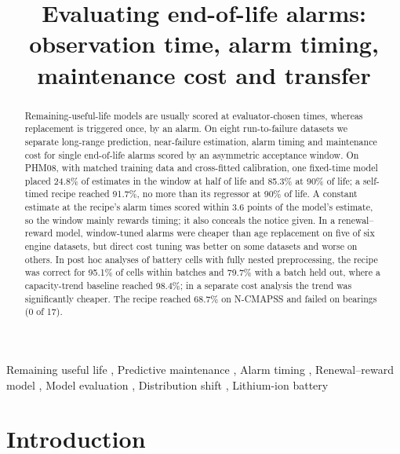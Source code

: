 \documentclass[a4paper,fleqn,doubleblind]{cas-dc}
\begin{document}
\let\WriteBookmarks\relax
\let\printorcid\relax
\def\floatpagepagefraction{1}
\def\textpagefraction{.001}
\title [mode = title]{Evaluating end-of-life alarms: observation time, alarm timing, maintenance cost and transfer}
\begin{abstract}
Remaining-useful-life models are usually scored at evaluator-chosen times, whereas replacement is triggered once, by an alarm. On eight run-to-failure datasets we separate long-range prediction, near-failure estimation, alarm timing and maintenance cost for single end-of-life alarms scored by an asymmetric acceptance window. On PHM08, with matched training data and cross-fitted calibration, one fixed-time model placed 24.8\% of estimates in the window at half of life and 85.3\% at 90\% of life; a self-timed recipe reached 91.7\%, no more than its regressor at 90\% of life. A constant estimate at the recipe's alarm times scored within 3.6 points of the model's estimate, so the window mainly rewards timing; it also conceals the notice given. In a renewal--reward model, window-tuned alarms were cheaper than age replacement on five of six engine datasets, but direct cost tuning was better on some datasets and worse on others. In post hoc analyses of battery cells with fully nested preprocessing, the recipe was correct for 95.1\% of cells within batches and 79.7\% with a batch held out, where a capacity-trend baseline reached 98.4\%; in a separate cost analysis the trend was significantly cheaper. The recipe reached 68.7\% on N-CMAPSS and failed on bearings (0 of 17).
\end{abstract}
\begin{keywords}
Remaining useful life \sep
Predictive maintenance \sep
Alarm timing \sep
Renewal--reward model \sep
Model evaluation \sep
Distribution shift \sep
Lithium-ion battery
\end{keywords}
\maketitle
\linenumbers
\section{Introduction}\label{sec:1}
\end{document}
